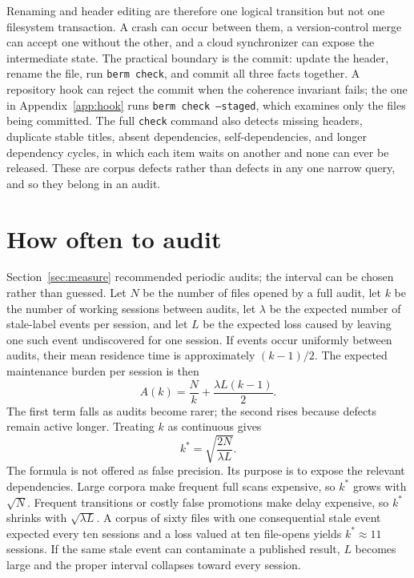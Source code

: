 \documentclass[11pt]{article}
\begin{document}
Renaming and header editing are therefore one logical transition but not one filesystem transaction. A crash can occur between them, a version-control merge can accept one without the other, and a cloud synchronizer can expose the intermediate state. The practical boundary is the commit: update the header, rename the file, run \texttt{berm check}, and commit all three facts together. A repository hook can reject the commit when the coherence invariant fails; the one in Appendix~\ref{app:hook} runs \texttt{berm check --staged}, which examines only the files being committed. The full \texttt{check} command also detects missing headers, duplicate stable titles, absent dependencies, self-dependencies, and longer dependency cycles, in which each item waits on another and none can ever be released. These are corpus defects rather than defects in any one narrow query, and so they belong in an audit.

\section{How often to audit}\label{sec:audit}

Section~\ref{sec:measure} recommended periodic audits; the interval can be chosen rather than guessed. Let $N$ be the number of files opened by a full audit, let $k$ be the number of working sessions between audits, let $\lambda$ be the expected number of stale-label events per session, and let $L$ be the expected loss caused by leaving one such event undiscovered for one session. If events occur uniformly between audits, their mean residence time is approximately $(k-1)/2$. The expected maintenance burden per session is then
\[
                 A(k)=\frac{N}{k}+\frac{\lambda L(k-1)}{2}.
\]
The first term falls as audits become rarer; the second rises because defects remain active longer. Treating $k$ as continuous gives
\[
                         k^{*}=\sqrt{\frac{2N}{\lambda L}}.
\]
The formula is not offered as false precision. Its purpose is to expose the relevant dependencies. Large corpora make frequent full scans expensive, so $k^{*}$ grows with $\sqrt N$. Frequent transitions or costly false promotions make delay expensive, so $k^{*}$ shrinks with $\sqrt{\lambda L}$. A corpus of sixty files with one consequential stale event expected every ten sessions and a loss valued at ten file-opens yields $k^{*}\approx 11$ sessions. If the same stale event can contaminate a published result, $L$ becomes large and the proper interval collapses toward every session.
\end{document}
